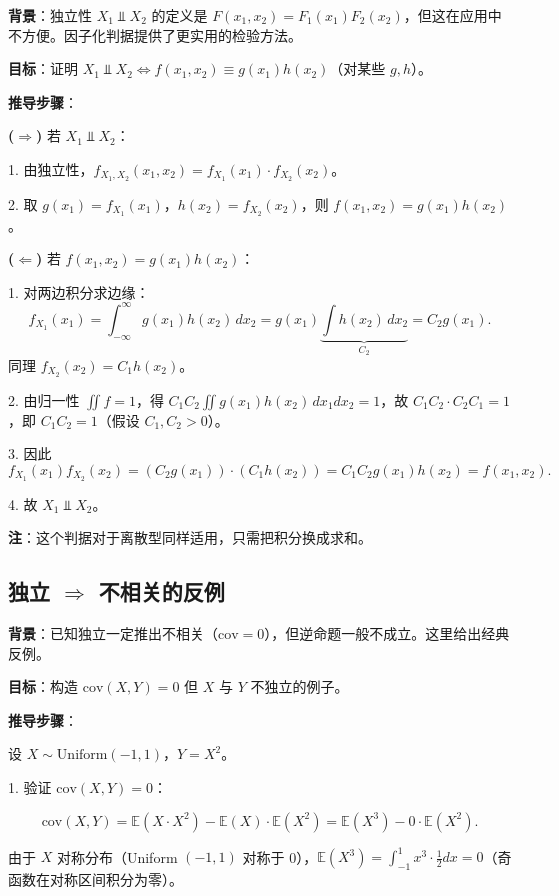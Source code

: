 \textbf{背景}：独立性 $X_1 \Perp X_2$ 的定义是 $F(x_1, x_2) = F_1(x_1)F_2(x_2)$，但这在应用中不方便。因子化判据提供了更实用的检验方法。

\textbf{目标}：证明 $X_1 \Perp X_2 \iff f(x_1, x_2) \equiv g(x_1)h(x_2)$（对某些 $g, h$）。

\textbf{推导步骤}：

\textbf{($\Rightarrow$)} 若 $X_1 \Perp X_2$：

1. 由独立性，$f_{X_1, X_2}(x_1, x_2) = f_{X_1}(x_1) \cdot f_{X_2}(x_2)$。

2. 取 $g(x_1) = f_{X_1}(x_1)$，$h(x_2) = f_{X_2}(x_2)$，则 $f(x_1, x_2) = g(x_1)h(x_2)$。

\textbf{($\Leftarrow$)} 若 $f(x_1, x_2) = g(x_1)h(x_2)$：

1. 对两边积分求边缘：
\[
f_{X_1}(x_1) = \int_{-\infty}^{\infty} g(x_1) h(x_2) \, dx_2 = g(x_1) \underbrace{\int h(x_2) \, dx_2}_{C_2} = C_2 g(x_1).
\]
同理 $f_{X_2}(x_2) = C_1 h(x_2)$。

2. 由归一性 $\iint f = 1$，得 $C_1 C_2 \iint g(x_1) h(x_2) \, dx_1 dx_2 = 1$，故 $C_1 C_2 \cdot C_2 C_1 = 1$，即 $C_1 C_2 = 1$（假设 $C_1, C_2 > 0$）。

3. 因此
\[
f_{X_1}(x_1) f_{X_2}(x_2) = (C_2 g(x_1)) \cdot (C_1 h(x_2)) = C_1 C_2 g(x_1) h(x_2) = f(x_1, x_2).
\]

4. 故 $X_1 \Perp X_2$。

\textbf{注}：这个判据对于离散型同样适用，只需把积分换成求和。

\subsection{独立 $\Rightarrow$ 不相关的反例}\label{sec:derivation-ch2-independent-implies-uncorrelated}

\textbf{背景}：已知独立一定推出不相关（$\text{cov} = 0$），但逆命题一般不成立。这里给出经典反例。

\textbf{目标}：构造 $\text{cov}(X, Y) = 0$ 但 $X$ 与 $Y$ 不独立的例子。

\textbf{推导步骤}：

设 $X \sim \text{Uniform}(-1, 1)$，$Y = X^2$。

1. 验证 $\text{cov}(X, Y) = 0$：

\[
\text{cov}(X, Y) = \mathbb{E}(X \cdot X^2) - \mathbb{E}(X) \cdot \mathbb{E}(X^2) = \mathbb{E}(X^3) - 0 \cdot \mathbb{E}(X^2).
\]

由于 $X$ 对称分布（Uniform $( -1, 1)$ 对称于 0），$\mathbb{E}(X^3) = \int_{-1}^1 x^3 \cdot \frac{1}{2} dx = 0$（奇函数在对称区间积分为零）。

